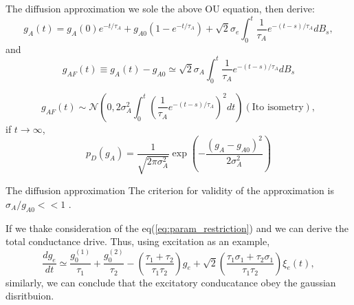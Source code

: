 \documentclass{beamer}
\begin{document}
\begin{frame}{The diffusion approximation}
	 we sole the above OU equation, then derive:
	 \begin{equation}
	 	g_{A}(t) = g_{A}(0)e^{-t/\tau_{A}} + g_{A 0} \left( 1 - e^{-t/\tau_{A}}\right) + \sqrt{2} \sigma_{e} \int_{0}^{t} \dfrac{1}{\tau_{A}} e^{-(t - s) / \tau_{A}} dB_{s}, 
	 \end{equation}
 	and 
	 \begin{equation}
	 	g_{A F}(t) \equiv g_{A}(t)-g_{A 0} \simeq \sqrt{2} \sigma_{A} \int_{0}^{t} \dfrac{1}{\tau_{A}} e^{-(t - s) / \tau_{A}} dB_{s}
	 \end{equation}
 	\par 
 	\begin{equation}
 		g_{A F}(t) \sim \mathcal{N}\left(0, 2 \sigma_{A}^{2} \int_{0}^{t} (\dfrac{1}{\tau_{A}}e^{-(t - s) / \tau_{A}})^{2} dt\right) (\text{Ito isometry}) ,
 	\end{equation}
 	if $ t \rightarrow \infty $, 
 	\begin{equation}
 		p_{D}\left(g_{A}\right)=\frac{1}{\sqrt{2 \pi \sigma_{A}^{2}}} \exp \left(-\frac{\left(g_{A}-g_{A 0}\right)^{2}}{2 \sigma_{A}^{2}}\right)
 	\end{equation}
 	
\end{frame}
\begin{frame}{The diffusion approximation}
	The criterion for validity of the approximation is $ \sigma_{A} / g_{A 0} << 1$ .
	\par 
	If we thake consideration of the eq(\ref{eq:param_restriction}) and we can derive the total conductance drive. Thus, using excitation as an example,
	\begin{equation*}
		\frac{d g_{e}}{d t} \simeq \dfrac{g_{0}^{(1)}}{\tau_{1}} + \dfrac{g_{0}^{(2)}}{\tau_{2}} - (\dfrac{\tau_{1}+\tau_{2}}{\tau_{1}\tau_{2}})g_{e}+\sqrt{2} (\dfrac{\tau_{1}\sigma_{1}+\tau_{2}\sigma_{1}}{\tau_{1}\tau_{2}}) \xi_{e}(t) , 
	\end{equation*}
	similarly, we can conclude that the excitatory conducatance obey the gaussian disritbuion.
\end{frame}
\end{document}
